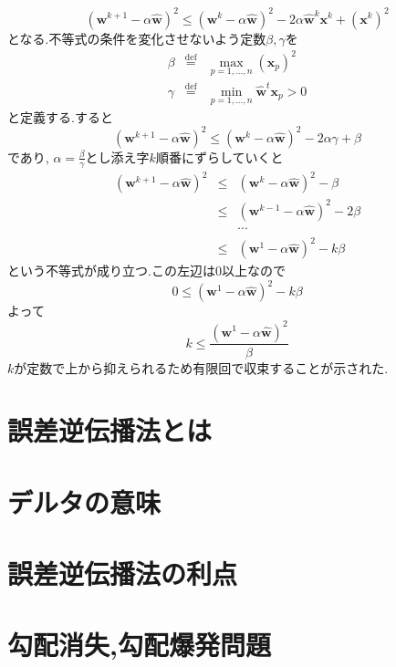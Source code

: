 \documentclass[twocolumn]{jarticle}
\begin{document}
\begin{equation}
  (\bm{w}^{k + 1} - \alpha \hat{\bm{w}})^2 \le (\bm{w}^{k} - \alpha \hat{\bm{w}})^2 - 2 \alpha \hat{\bm{w}}^k\bm{x}^k + (\bm{x}^k)^2
\end{equation}
となる.不等式の条件を変化させないよう定数$\beta, \gamma$を
\begin{eqnarray}
  \beta &\overset{\mathrm{def}}{=}& \max_{p = 1, \dots, n} (\bm{x}_p)^2 \\
  \gamma &\overset{\mathrm{def}}{=}& \min_{p = 1, \dots, n} \hat{\bm{w}}^t \bm{x}_p > 0
\end{eqnarray}
と定義する.すると
\begin{equation}
  (\bm{w}^{k + 1} - \alpha \hat{\bm{w}})^2 \le (\bm{w}^{k} - \alpha \hat{\bm{w}})^2 - 2 \alpha \gamma + \beta
\end{equation}
であり, $\alpha = \frac{\beta}{\gamma}$とし添え字$k$順番にずらしていくと
\begin{eqnarray}
  (\bm{w}^{k + 1} - \alpha \hat{\bm{w}})^2 &\le& (\bm{w}^{k} - \alpha \hat{\bm{w}})^2 - \beta \\
  &\le& (\bm{w}^{k - 1} - \alpha \hat{\bm{w}})^2 - 2 \beta \\
　&& \cdots \nonumber \\
  &\le& (\bm{w}^{1} - \alpha \hat{\bm{w}})^2 - k \beta
\end{eqnarray}
という不等式が成り立つ.この左辺は0以上なので
\begin{equation}
  0 \le  (\bm{w}^{1} - \alpha \hat{\bm{w}})^2 - k \beta
\end{equation}
よって
\begin{equation}
  k \le \frac{(\bm{w}^{1} - \alpha \hat{\bm{w}})^2 }{\beta}
\end{equation}
$k$が定数で上から抑えられるため有限回で収束することが示された.

\section{誤差逆伝播法とは}
\section{デルタの意味}
\section{誤差逆伝播法の利点}
\section{勾配消失,勾配爆発問題}
\end{document}
